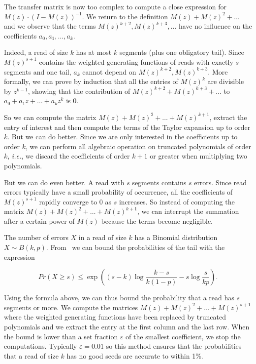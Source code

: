 \documentclass{article}
\begin{document}
The transfer matrix is now too complex to compute a close expression
for $M(z)\cdot(I-M(z))^{-1}$. We return to the definition $M(z) + M(z)^2 +
\ldots$ and we observe that the terms $M(z)^{k+2}, M(z)^{k+3}, \ldots$
have no influence on the coefficients $a_0, a_1, \ldots, a_k$.

Indeed, a read of size $k$ has at most $k$ segments (plus one obligatory
tail). Since $M(z)^{s+1}$ contains the weighted generating functions of
reads with exactly $s$ segments and one tail, $a_k$ cannot depend on
$M(z)^{k+2}, M(z)^{k+3}$. More formally, we can prove by induction that
all the entries of $M(z)^k$ are divisible by $z^{k-1}$, showing that the
contribution of $M(z)^{k+2} + M(z)^{k+3} + \ldots$ to $a_0 + a_1z + \ldots
+a_kz^k$ is $0$.

So we can compute the matrix $M(z) + M(z)^2 + \ldots + M(z)^{k+1}$,
extract the entry of interest and then compute the terms of the Taylor
expansion up to order $k$. But we can do better. Since we are only
interested in the coefficients up to order $k$, we can perform all
algebraic operation on truncated polynomials of order $k$, \textit{i.e.},
we discard the coefficients of order $k+1$ or greater when multiplying two
polynomials.

But we can do even better. A read with $s$ segments contains $s$ errors.
Since read errors typically have a small probability of occurrence, all
the coefficients of $M(z)^{s+1}$ rapidly converge to $0$ as $s$ increases.
So instead of computing the matrix $M(z) + M(z)^2 + \ldots + M(z)^{k+1}$,
we can interrupt the summation after a certain power of $M(z)$ because the
terms become negligible.

The number of errors $X$ in a read of size $k$ has a Binomial
distribution $X \sim B(k,p)$. From~\cite{arratia1989tutorial} we can bound
the probabilities of the tail with the expression

\begin{equation}
\label{eq:bound}
Pr(X \geq s) \leq \exp \left( (s-k)\log \frac{k-s}{k(1-p)} -s\log
\frac{s}{kp} \right).
\end{equation}

Using the formula above, we can thus bound the probability that a read has
$s$ segments or more. We compute the matrices $M(z) + M(z)^2 + \ldots
+M(z)^{s+1}$ where the weighted generating functions have been replaced by
truncated polynomials and we extract the entry at the first column and the
last row. When the bound is lower than a set fraction $\varepsilon$ of the
smallest coefficient, we stop the computations. Typically $\varepsilon =
0.01$ so this method ensures that the probabilities that a read of size
$k$ has no good seeds are accurate to within 1\%.
\end{document}
